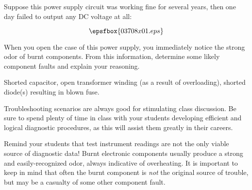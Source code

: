 

Suppose this power supply circuit was working fine for several years, then one day failed to output any DC voltage at all:

$$\epsfbox{03708x01.eps}$$

When you open the case of this power supply, you immediately notice the strong odor of burnt components.  From this information, determine some likely component faults and explain your reasoning.







Shorted capacitor, open transformer winding (as a result of overloading), shorted diode(s) resulting in blown fuse.







Troubleshooting scenarios are always good for stimulating class discussion.  Be sure to spend plenty of time in class with your students developing efficient and logical diagnostic procedures, as this will assist them greatly in their careers.

Remind your students that test instrument readings are not the only viable source of diagnostic data!  Burnt electronic components usually produce a strong and easily-recognized odor, always indicative of overheating.  It is important to keep in mind that often the burnt component is {\it not} the original source of trouble, but may be a casualty of some other component fault.




